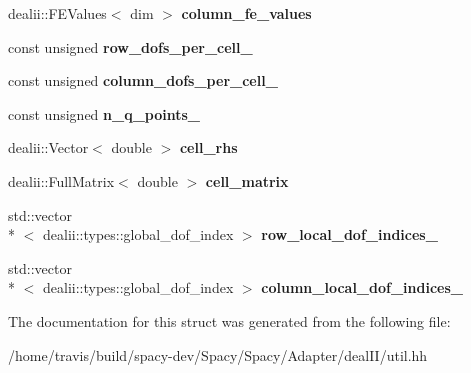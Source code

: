 \begin{DoxyCompactItemize}
\item 
\hypertarget{structSpacy_1_1dealII_1_1Detail_1_1LocalAssemblyBase_aaf9d2501f535b337e2d374b41275d5ae}{dealii\-::\-F\-E\-Values$<$ dim $>$ {\bfseries column\-\_\-fe\-\_\-values}}\label{structSpacy_1_1dealII_1_1Detail_1_1LocalAssemblyBase_aaf9d2501f535b337e2d374b41275d5ae}

\item 
\hypertarget{structSpacy_1_1dealII_1_1Detail_1_1LocalAssemblyBase_a996b6952c0fc08aa7f2817c7a4f2b313}{const unsigned {\bfseries row\-\_\-dofs\-\_\-per\-\_\-cell\-\_\-}}\label{structSpacy_1_1dealII_1_1Detail_1_1LocalAssemblyBase_a996b6952c0fc08aa7f2817c7a4f2b313}

\item 
\hypertarget{structSpacy_1_1dealII_1_1Detail_1_1LocalAssemblyBase_a09cc798555d81b9343a4cfd352b4789f}{const unsigned {\bfseries column\-\_\-dofs\-\_\-per\-\_\-cell\-\_\-}}\label{structSpacy_1_1dealII_1_1Detail_1_1LocalAssemblyBase_a09cc798555d81b9343a4cfd352b4789f}

\item 
\hypertarget{structSpacy_1_1dealII_1_1Detail_1_1LocalAssemblyBase_a009993ec7e3c5e38ca44f2dbd160a280}{const unsigned {\bfseries n\-\_\-q\-\_\-points\-\_\-}}\label{structSpacy_1_1dealII_1_1Detail_1_1LocalAssemblyBase_a009993ec7e3c5e38ca44f2dbd160a280}

\item 
\hypertarget{structSpacy_1_1dealII_1_1Detail_1_1LocalAssemblyBase_a407f1e4a2f7d293a61dd295be569d0d2}{dealii\-::\-Vector$<$ double $>$ {\bfseries cell\-\_\-rhs}}\label{structSpacy_1_1dealII_1_1Detail_1_1LocalAssemblyBase_a407f1e4a2f7d293a61dd295be569d0d2}

\item 
\hypertarget{structSpacy_1_1dealII_1_1Detail_1_1LocalAssemblyBase_a4c9f8591abb90e2af136b0c82c3fd973}{dealii\-::\-Full\-Matrix$<$ double $>$ {\bfseries cell\-\_\-matrix}}\label{structSpacy_1_1dealII_1_1Detail_1_1LocalAssemblyBase_a4c9f8591abb90e2af136b0c82c3fd973}

\item 
\hypertarget{structSpacy_1_1dealII_1_1Detail_1_1LocalAssemblyBase_a07f3065dbebecd404259ed7a374544a5}{std\-::vector\\*
$<$ dealii\-::types\-::global\-\_\-dof\-\_\-index $>$ {\bfseries row\-\_\-local\-\_\-dof\-\_\-indices\-\_\-}}\label{structSpacy_1_1dealII_1_1Detail_1_1LocalAssemblyBase_a07f3065dbebecd404259ed7a374544a5}

\item 
\hypertarget{structSpacy_1_1dealII_1_1Detail_1_1LocalAssemblyBase_aa9aee3575f199c88d3414b4f7e53cb26}{std\-::vector\\*
$<$ dealii\-::types\-::global\-\_\-dof\-\_\-index $>$ {\bfseries column\-\_\-local\-\_\-dof\-\_\-indices\-\_\-}}\label{structSpacy_1_1dealII_1_1Detail_1_1LocalAssemblyBase_aa9aee3575f199c88d3414b4f7e53cb26}

\end{DoxyCompactItemize}


The documentation for this struct was generated from the following file\-:\begin{DoxyCompactItemize}
\item 
/home/travis/build/spacy-\/dev/\-Spacy/\-Spacy/\-Adapter/deal\-I\-I/util.\-hh\end{DoxyCompactItemize}
